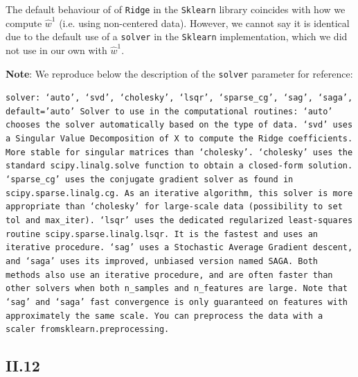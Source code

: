 \documentclass{homework}
\begin{document}
\textcolor{OliveGreen}{The default behaviour of of \texttt{Ridge} in the \texttt{Sklearn} library coincides with how we compute 
$\hat{w}^1$ (i.e. using non-centered data). However, we cannot say it is identical due to the default use of a \texttt{solver} in the 
\texttt{Sklearn} implementation, which we did not use in our own with $\hat{w}^1$.}

\textbf{Note}: We reproduce below the description of the \texttt{solver} parameter for reference:
\begin{displayquote}
\texttt{solver: ‘auto’, ‘svd’, ‘cholesky’, ‘lsqr’, ‘sparse\_cg’, ‘sag’, ‘saga’, default=’auto’\newline\newline
Solver to use in the computational routines:\newline\newline
‘auto’ chooses the solver automatically based on the type of data.\newline\newline
‘svd’ uses a Singular Value Decomposition of X to compute the Ridge coefficients. More stable for singular matrices than ‘cholesky’.\newline\newline
‘cholesky’ uses the standard scipy.linalg.solve function to obtain a closed-form solution.\newline\newline
‘sparse\_cg’ uses the conjugate gradient solver as found in scipy.sparse.linalg.cg. As an iterative algorithm, this solver is more appropriate than ‘cholesky’ for large-scale data (possibility to set tol and max\_iter).\newline\newline
‘lsqr’ uses the dedicated regularized least-squares routine scipy.sparse.linalg.lsqr. It is the fastest and uses an iterative procedure.\newline\newline
‘sag’ uses a Stochastic Average Gradient descent, and ‘saga’ uses its improved, unbiased version named SAGA. Both methods also use an iterative procedure, and are often faster than other solvers when both n\_samples and n\_features are large. Note that ‘sag’ and ‘saga’ fast convergence is only guaranteed on features with approximately the same scale. You can preprocess the data with a scaler from\newline sklearn.preprocessing.}
\end{displayquote}

\subsection*{II.12} 
\end{document}
